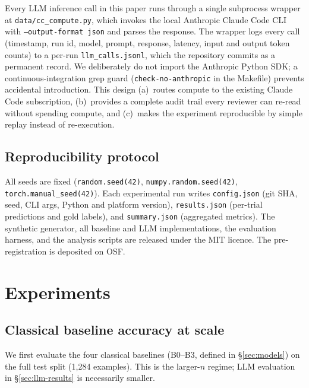 \documentclass[preprint,authoryear,1p,12pt]{elsarticle}
\begin{document}
Every LLM inference call in this paper runs through a single subprocess
wrapper at \texttt{data/cc\_compute.py}, which invokes the local Anthropic
Claude Code CLI \citep{anthropic2026claudecode} with
\texttt{--output-format json} and parses the response. The wrapper logs
every call (timestamp, run id, model, prompt, response, latency, input
and output token counts) to a per-run \texttt{llm\_calls.jsonl}, which
the repository commits as a permanent record. We deliberately do not
import the Anthropic Python SDK; a continuous-integration grep guard
(\texttt{check-no-anthropic} in the Makefile) prevents accidental
introduction. This design (a)~routes compute to the existing Claude Code
subscription, (b)~provides a complete audit trail every reviewer can
re-read without spending compute, and (c)~makes the experiment
reproducible by simple replay instead of re-execution.

\subsection{Reproducibility protocol}
\label{sec:reproducibility-method}

All seeds are fixed (\texttt{random.seed(42)}, \texttt{numpy.random.seed(42)},
\texttt{torch.manual\_seed(42)}). Each experimental run writes
\texttt{config.json} (git SHA, seed, CLI args, Python and platform
version), \texttt{results.json} (per-trial predictions and gold labels),
and \texttt{summary.json} (aggregated metrics). The synthetic generator,
all baseline and LLM implementations, the evaluation harness, and the
analysis scripts are released under the MIT licence. The pre-registration
\citep{nosek2018preregistration} is deposited on OSF.

\section{Experiments}
\label{sec:experiments}

\subsection{Classical baseline accuracy at scale}
\label{sec:synth-baselines}

We first evaluate the four classical baselines (B0--B3, defined in
\S\ref{sec:models}) on the full test split (1{,}284 examples). This is
the larger-\(n\) regime; LLM evaluation in \S\ref{sec:llm-results} is
necessarily smaller.
\end{document}
